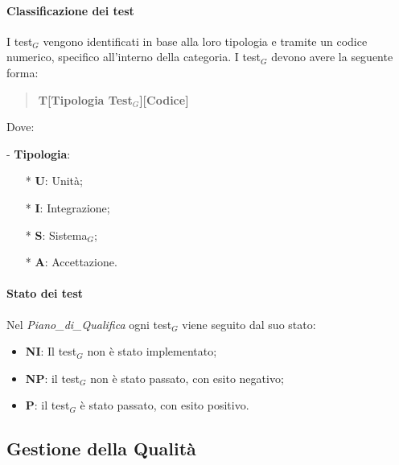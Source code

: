\documentclass[10pt]{article}
\begin{document}
\begin{justify}
    \paragraph{Classificazione dei test}
    I test$_G$ vengono identificati in base alla loro tipologia e tramite un codice numerico, specifico all'interno della categoria. I test$_G$ devono avere la seguente forma:
    \begin{quote}
    \textbf{T[Tipologia Test$_G$][Codice]}\\
    \end{quote}
    Dove:
    \item [-] \textbf{Tipologia}:
    \begin{itemize}
        \item [*] \textbf{U}: Unità;
        \item [*] \textbf{I}: Integrazione;
        \item [*] \textbf{S}: Sistema$_G$;
        \item [*] \textbf{A}: Accettazione.
    \end{itemize}

    \paragraph{Stato dei test}
    Nel \textit{Piano\_di\_Qualifica} ogni test$_G$ viene seguito dal suo stato:
    \begin{itemize}
    \item \textbf{NI}: Il test$_G$ non è stato implementato;
    \item \textbf{NP}: il test$_G$ non è stato passato, con esito negativo;
    \item \textbf{P}: il test$_G$ è stato passato, con esito positivo.
    \end{itemize}

\subsection{Gestione della Qualità}


\end{justify}
\end{document}
